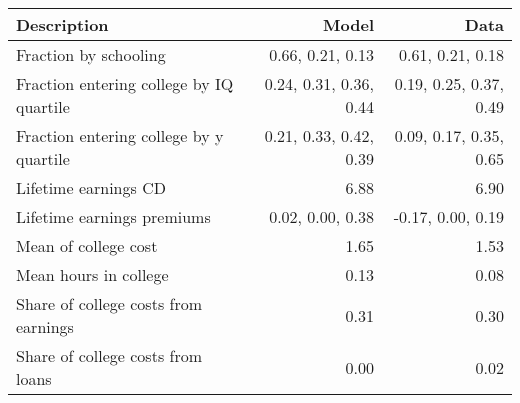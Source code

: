 \begin{tabular}{lrr}
\hline
Description & Model  & Data  \\ 
\hline
Fraction by schooling & 0.66, 0.21, 0.13  & 0.61, 0.21, 0.18  \\ 
Fraction entering college by IQ quartile & 0.24, 0.31, 0.36, 0.44  & 0.19, 0.25, 0.37, 0.49  \\ 
Fraction entering college by y quartile & 0.21, 0.33, 0.42, 0.39  & 0.09, 0.17, 0.35, 0.65  \\ 
Lifetime earnings CD & 6.88  & 6.90  \\ 
Lifetime earnings premiums & 0.02, 0.00, 0.38  & -0.17, 0.00, 0.19  \\ 
Mean of college cost & 1.65  & 1.53  \\ 
Mean hours in college & 0.13  & 0.08  \\ 
Share of college costs from earnings & 0.31  & 0.30  \\ 
Share of college costs from loans & 0.00  & 0.02  \\ 
\hline
\end{tabular}%
